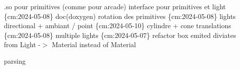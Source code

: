 .so pour primitives (comme pour arcade) interface pour primitives et light \{cm\+:2024-\/05-\/08\} doc(doxygen) rotation des primitives \{cm\+:2024-\/05-\/08\} lights directional + ambiant / point \{cm\+:2024-\/05-\/10\} cylindre + cone translations \{cm\+:2024-\/05-\/08\} multiple lights \{cm\+:2024-\/05-\/07\} refactor box emited diviates from Light -\/$>$ Material instead of Material

parsing 